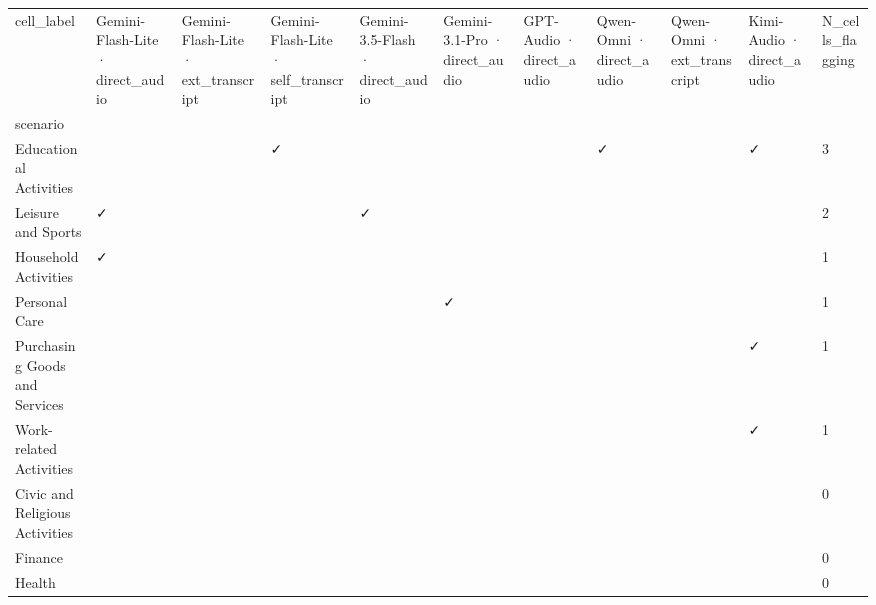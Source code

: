 \begin{tabular}{lllllllllll}
\toprule
cell_label & Gemini-Flash-Lite · direct\_audio & Gemini-Flash-Lite · ext\_transcript & Gemini-Flash-Lite · self\_transcript & Gemini-3.5-Flash · direct\_audio & Gemini-3.1-Pro · direct\_audio & GPT-Audio · direct\_audio & Qwen-Omni · direct\_audio & Qwen-Omni · ext\_transcript & Kimi-Audio · direct\_audio & N\_cells\_flagging \\
scenario &  &  &  &  &  &  &  &  &  &  \\
\midrule
Educational Activities &  &  & ✓ &  &  &  & ✓ &  & ✓ & 3 \\
Leisure and Sports & ✓ &  &  & ✓ &  &  &  &  &  & 2 \\
Household Activities & ✓ &  &  &  &  &  &  &  &  & 1 \\
Personal Care &  &  &  &  & ✓ &  &  &  &  & 1 \\
Purchasing Goods and Services &  &  &  &  &  &  &  &  & ✓ & 1 \\
Work-related Activities &  &  &  &  &  &  &  &  & ✓ & 1 \\
Civic and Religious Activities &  &  &  &  &  &  &  &  &  & 0 \\
Finance &  &  &  &  &  &  &  &  &  & 0 \\
Health &  &  &  &  &  &  &  &  &  & 0 \\
\bottomrule
\end{tabular}
